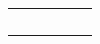 \documentclass[12pt,a4paper]{article}
\begin{document}
\begin{landscape}
\begin{table}[ht!]
\begin{tabular}{|c|l|l|l|c|c|}
			                                                       &                           & \multirow{1}{*}{\gbbbbbbbbbbbbbb}   & &  &                                                                                                                                                        \\\cline{3-4}
			                                                       &                           & \multirow{2}{*}{\gbbbbbbbbbbbbbbb}  & &  &                                                                                                                                                        \\\cline{4-4}
			                                                       &                           &                                     & &  &                                                                                                                                                        \\\cline{3-4}
			                                                       &                           & \multirow{2}{*}{\gbbbbbbbbbbbbbbbb} & &  &                                                                                                                                                        \\\cline{4-4}
			                                                       &                           &                                     & &  &                                                                                                                                                        \\\hline
		\end{tabular}
	\end{table}
\end{landscape}
\end{document}
